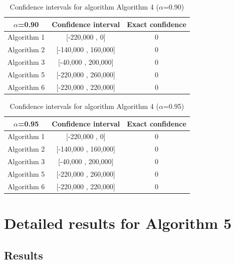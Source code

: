 \documentclass[a4paper,10pt]{article}
\begin{document}
\begin{table}[!htp]
\centering\small
\begin{tabular}{
|c|c|c|}
\hline
 $\alpha$=0.90 & Confidence interval & Exact confidence \\ \hline 
Algorithm 1 & [-220,000 , 0] & 0\\ \hline 
Algorithm 2 & [-140,000 , 160,000] & 0\\ \hline 
Algorithm 3 & [-40,000 , 200,000] & 0\\ \hline 
Algorithm 5 & [-220,000 , 260,000] & 0\\ \hline 
Algorithm 6 & [-220,000 , 220,000] & 0\\ \hline 

\end{tabular}
\caption{Confidence intervals for algorithm Algorithm 4 ($\alpha$=0.90)}
\end{table}
\begin{table}[!htp]
\centering\small
\begin{tabular}{
|c|c|c|}
\hline
 $\alpha$=0.95 & Confidence interval & Exact confidence \\ \hline 
Algorithm 1 & [-220,000 , 0] & 0\\ \hline 
Algorithm 2 & [-140,000 , 160,000] & 0\\ \hline 
Algorithm 3 & [-40,000 , 200,000] & 0\\ \hline 
Algorithm 5 & [-220,000 , 260,000] & 0\\ \hline 
Algorithm 6 & [-220,000 , 220,000] & 0\\ \hline 

\end{tabular}
\caption{Confidence intervals for algorithm Algorithm 4 ($\alpha$=0.95)}
\end{table}

 \clearpage 


\section{Detailed results for Algorithm 5}


\subsection{Results}
\end{document}
